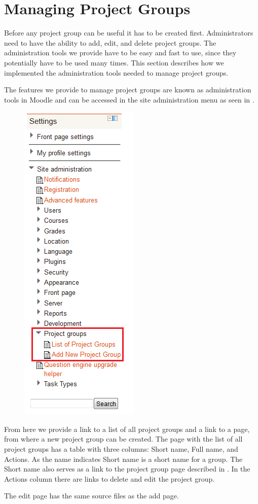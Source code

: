 \section{Managing Project Groups} %
Before any project group can be useful it has to be created first.
Administrators need to have the ability to add, edit, and delete project groups.
The administration tools we provide have to be easy and fast to use, since they potentially have to be used many times.
This section describes how we implemented the administration tools needed to manage project groups.

The features we provide to manage project groups are known as administration tools in Moodle and can be accessed in the site administration menu as seen in .

\begin{figure}[htb]
	\centering
		\includegraphics[scale=0.75]{images/admin-navigation.png}
	\label{fig:navigation}
\end{figure}

From here we provide a link to a list of all project groups and a link to a page, from where a new project group can be created.
The page with the list of all project groups has a table with three columns: Short name, Full name, and Actions.
As the name indicates Short name is a short name for a group. 
The Short name also serves as a link to the project group page described in .
In the Actions column there are links to delete and edit the project group.

The edit page has the same source files as the add page.